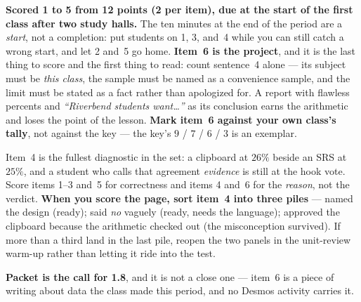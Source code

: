 \documentclass[10pt]{article}
\begin{document}
\begin{teachernote}[Homework]
\textbf{Scored 1 to 5 from 12 points (2 per item), due at the start of the first class after two study
halls.} The ten minutes at the end of the period are a \emph{start}, not a completion: put
students on 1, 3, and~4 while you can still catch a wrong start, and let 2 and~5 go home.
\textbf{Item~6 is the project}, and it is the last thing to score and the first thing to read:
count sentence~4 alone --- its subject must be \emph{this class}, the sample must be named as a
convenience sample, and the limit must be stated as a fact rather than apologized for. A report
with flawless percents and \emph{``Riverbend students want\ldots''} as its conclusion earns the
arithmetic and loses the point of the lesson. \textbf{Mark item~6 against your own class's tally},
not against the key --- the key's $9$ / $7$ / $6$ / $3$ is an exemplar.

Item~4 is the fullest diagnostic in the set: a clipboard at $26\%$ beside an SRS at $25\%$, and a
student who calls that agreement \emph{evidence} is still at the hook vote. Score items 1--3 and~5
for correctness and items 4 and~6 for the \emph{reason}, not the verdict. \textbf{When you score
the page, sort item~4 into three piles} --- named the design (ready); said \emph{no} vaguely
(ready, needs the language); approved the clipboard because the arithmetic checked out (the
misconception survived). If more than a third land in the last pile, reopen the two panels in the
unit-review warm-up rather than letting it ride into the test.

\textbf{Packet is the call for 1.8}, and it is not a close one --- item~6 is a piece of writing
about data the class made this period, and no Desmos activity carries it.
\end{teachernote}
\end{document}
